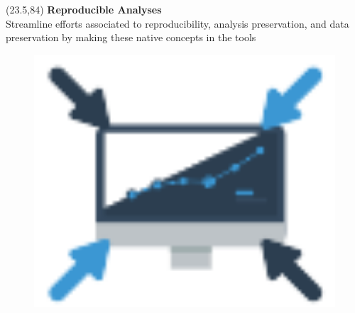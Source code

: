 \begin{textblock}{17.5}(23.5,84)
{\bf Reproducible Analyses} \\
Streamline efforts associated to reproducibility, analysis preservation, and data preservation by making these native concepts in the tools
\begin{figure}[tbph]
\centering
\includegraphics[width=1.0\textwidth]{collaborate.png}
\end{figure}
\end{textblock}

